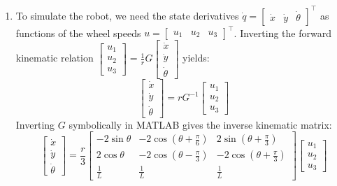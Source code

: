 \begin{enumerate}[label=\textbf{(\alph*)}]
    \item To simulate the robot, we need the state derivatives $\dot{q} = \begin{bmatrix} \dot{x} & \dot{y} & \dot{\theta} \end{bmatrix}^\top$ as functions of the wheel speeds $u = \begin{bmatrix} u_1 & u_2 & u_3 \end{bmatrix}^\top$. Inverting the forward kinematic relation $\begin{bmatrix} u_1 \\ u_2 \\ u_3 \end{bmatrix} = \frac{1}{r} G \begin{bmatrix} \dot{x} \\ \dot{y} \\ \dot{\theta} \end{bmatrix}$ yields:
    \begin{equation}
        \begin{bmatrix} \dot{x} \\ \dot{y} \\ \dot{\theta} \end{bmatrix} = r G^{-1} \begin{bmatrix} u_1 \\ u_2 \\ u_3 \end{bmatrix}
    \end{equation}
    Inverting $G$ symbolically in MATLAB gives the inverse kinematic matrix:
    \begin{equation}
        \begin{bmatrix} \dot{x} \\ \dot{y} \\ \dot{\theta} \end{bmatrix} = \frac{r}{3} \begin{bmatrix}
            -2\sin\theta & -2\cos\left(\theta + \frac{\pi}{6}\right) & 2\sin\left(\theta + \frac{\pi}{3}\right) \\[0.5em]
            2\cos\theta & -2\cos\left(\theta - \frac{\pi}{3}\right) & -2\cos\left(\theta + \frac{\pi}{3}\right) \\[0.5em]
            \frac{1}{L} & \frac{1}{L} & \frac{1}{L}
        \end{bmatrix} \begin{bmatrix} u_1 \\ u_2 \\ u_3 \end{bmatrix}
    \end{equation}


\end{enumerate}
